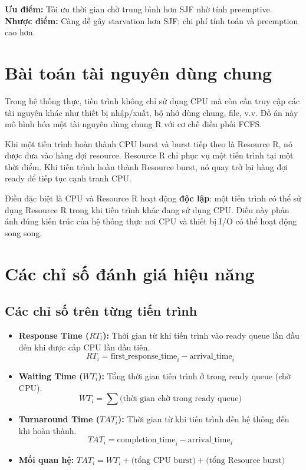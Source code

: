 \textbf{Ưu điểm:} Tối ưu thời gian chờ trung bình hơn SJF nhờ tính preemptive.
\textbf{Nhược điểm:} Càng dễ gây starvation hơn SJF; chi phí tính toán và preemption cao hơn.

\section{Bài toán tài nguyên dùng chung}

Trong hệ thống thực, tiến trình không chỉ sử dụng CPU mà còn cần truy cập các tài nguyên khác như thiết bị nhập/xuất, bộ nhớ dùng chung, file, v.v. Đồ án này mô hình hóa một tài nguyên dùng chung R với cơ chế điều phối FCFS.

Khi một tiến trình hoàn thành CPU burst và burst tiếp theo là Resource R, nó được đưa vào hàng đợi resource. Resource R chỉ phục vụ một tiến trình tại một thời điểm. Khi tiến trình hoàn thành Resource burst, nó quay trở lại hàng đợi ready để tiếp tục cạnh tranh CPU.

Điều đặc biệt là CPU và Resource R hoạt động \textbf{độc lập}: một tiến trình có thể sử dụng Resource R trong khi tiến trình khác đang sử dụng CPU. Điều này phản ánh đúng kiến trúc của hệ thống thực nơi CPU và thiết bị I/O có thể hoạt động song song.

\section{Các chỉ số đánh giá hiệu năng}

\subsection{Các chỉ số trên từng tiến trình}

\begin{itemize}
    \item \textbf{Response Time ($RT_i$):} Thời gian từ khi tiến trình vào ready queue lần đầu đến khi được cấp CPU lần đầu tiên.
    \begin{equation}
        RT_i = \text{first\_response\_time}_i - \text{arrival\_time}_i
    \end{equation}
    
    \item \textbf{Waiting Time ($WT_i$):} Tổng thời gian tiến trình ở trong ready queue (chờ CPU).
    \begin{equation}
        WT_i = \sum \text{(thời gian chờ trong ready queue)}
    \end{equation}
    
    \item \textbf{Turnaround Time ($TAT_i$):} Thời gian từ khi tiến trình đến hệ thống đến khi hoàn thành.
    \begin{equation}
        TAT_i = \text{completion\_time}_i - \text{arrival\_time}_i
    \end{equation}
    
    \item \textbf{Mối quan hệ:} $TAT_i = WT_i + \text{(tổng CPU burst)} + \text{(tổng Resource burst)}$
\end{itemize}

